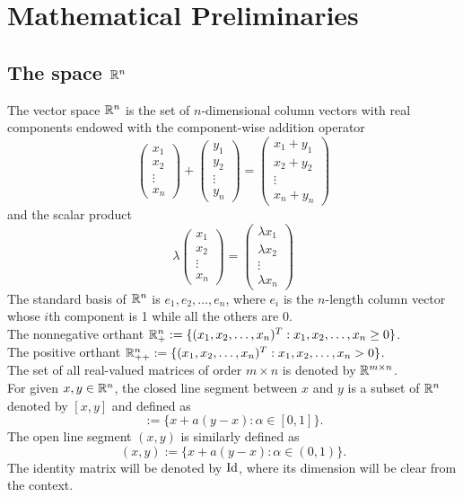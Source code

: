 \documentclass[10pt,a4paper]{article}
\begin{document}
\section{Mathematical Preliminaries}

\subsection{The space $\mathbb{R}^n$}
The vector space $\mathbb{R}^n$  is the set of $n$-dimensional column vectors with real components endowed with the component-wise addition operator
\begin{equation*}
	\begin{pmatrix}
		x_1\\
		x_2\\
		\vdots\\
		x_n
	\end{pmatrix}
+
\begin{pmatrix}
	y_1\\
	y_2\\
	\vdots\\
	y_n
\end{pmatrix}
= 
\begin{pmatrix}
	x_1+y_1\\
	x_2+y_2\\
	\vdots\\
	x_n + y_n
\end{pmatrix}
\end{equation*}
and the scalar product
\begin{equation*}
	\lambda \begin{pmatrix}
		x_1\\
		x_2\\
		\vdots\\
		x_n
	\end{pmatrix}
= 
\begin{pmatrix}
	\lambda x_1\\
	\lambda x_2\\
	\vdots\\
	\lambda x_n
\end{pmatrix}
\end{equation*}
The standard basis of $\mathbb{R}^n$ is $e_1, e_2, \dots, e_n$, where $e_i$ is the $n$-length column vector whose $i$th component is 1 while all the others are 0.\\
The nonnegative orthant $\mathbb{R}^n_+:=\{(x_1,x_2, \dots, x_n)^T: x_1, x_2,\dots,x_n\geq 0\}$.\\
The positive orthant $\mathbb{R}^n_{++}:=\{(x_1,x_2, \dots, x_n)^T: x_1, x_2,\dots,x_n> 0\}$.\\
The set of all real-valued matrices of order $m \times n$ is denoted by $\mathbb{R}^{m\times n}$.\\
For given $x, y \in \mathbb{R}^n$, the closed line segment between $x$ and $y$ is a subset of $\mathbb{R}^n$ denoted by $[x, y]$ and defined as 
\begin{equation*}
	[x,y]:= \{x+a(y-x): \alpha \in[0,1]\}.
\end{equation*}
The open line segment $(x,y)$ is similarly defined as  
\begin{equation*}
	(x,y):= \{x+a(y-x): \alpha \in(0,1)\}.
\end{equation*}
The identity matrix will be denoted by $\text{Id}$, where its dimension will be clear from the context.
\end{document}
